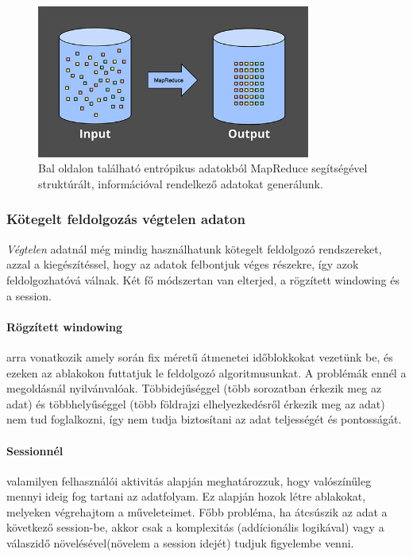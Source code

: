 \documentclass[a4paper,12pt]{article}
\begin{document}
\begin{figure}[ht!]
\centering
\includegraphics[width=90mm]{img/batch.jpg}
\caption{Bal oldalon található entrópikus adatokból MapReduce segítségével struktúrált, információval rendelkező adatokat generálunk. \label{batchreduce}}
\end{figure}

\subsubsection{Kötegelt feldolgozás végtelen adaton}
\textsl{Végtelen} adatnál még mindig használhatunk kötegelt feldolgozó rendszereket, azzal a kiegészítéssel, hogy az adatok felbontjuk véges részekre, így azok feldolgozhatóvá válnak. Két fő módszertan van elterjed, a rögzített windowing és a session.

\paragraph{Rögzített windowing} arra vonatkozik amely során fix méretű átmenetei időblokkokat vezetünk be, és ezeken az ablakokon futtatjuk le feldolgozó algoritmusunkat. A problémák ennél a megoldásnál nyilvánvalóak. Többidejűséggel (több sorozatban érkezik meg az adat) és többhelyűséggel (több földrajzi elhelyezkedésről érkezik meg az adat) nem tud foglalkozni, így nem tudja biztosítani az adat teljességét és pontosságát.

\paragraph{Sessionnél} valamilyen felhasználói aktivitás alapján meghatározzuk, hogy valószínűleg mennyi ideig fog tartani az adatfolyam. Ez alapján hozok létre ablakokat, melyeken végrehajtom a műveleteimet. Főbb probléma, ha átcsúszik az adat a következő session-be, akkor csak a komplexitás (addícionális logikával) vagy a válaszidő növelésével(növelem a session idejét) tudjuk figyelembe venni.
\end{document}

